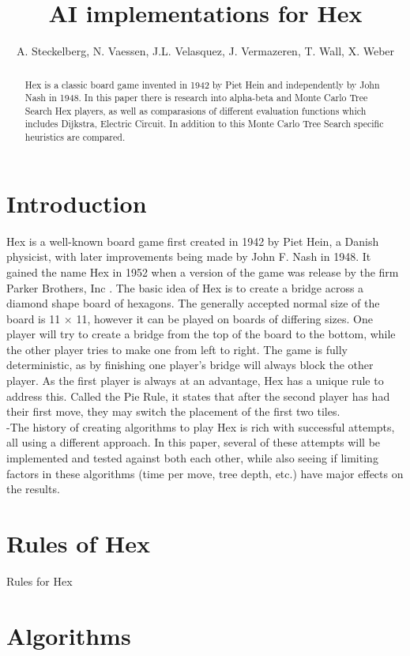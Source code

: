 \documentclass{ba-kecs}
\title{AI implementations for Hex}
\author{A. Steckelberg, N. Vaessen, J.L. Velasquez, J. Vermazeren, T. Wall, X. Weber}
\begin{document}
\maketitle

\begin{abstract}
 Hex is a classic board game invented in 1942 by Piet Hein and independently by John Nash in 1948. In this paper there is research into alpha-beta and Monte Carlo Tree Search Hex players, as well as comparasions of different evaluation functions which includes Dijkstra, Electric Circuit. In addition to this Monte Carlo Tree Search specific heuristics are compared.   
\end{abstract}

\section{Introduction}
Hex is a well-known board game first created in 1942 by Piet Hein, a Danish physicist, with later improvements being made by John F. Nash in 1948. It gained the name Hex in 1952 when a version of the game was release by the firm Parker Brothers, Inc \cite{gardener1959hex}. The basic idea of Hex is to create a bridge across a diamond shape board of hexagons. The generally accepted normal size of the board is 11 $\times$ 11, however it can be played on boards of differing sizes. One player will try to create a bridge from the top of the board to the bottom, while the other player tries to make one from left to right. The game is fully deterministic, as by finishing one player’s bridge will always block the other player. As the first player is always at an advantage, Hex has a unique rule to address this. Called the Pie Rule, it states that after the second player has had their first move, they may switch the placement of the first two tiles.\\
-The history of creating algorithms to play Hex is rich with successful attempts, all using a different approach. In this paper, several of these attempts will be implemented and tested against both each other, while also seeing if limiting factors in these algorithms (time per move, tree depth, etc.) have major effects on the results.



\section{Rules of Hex}
Rules for Hex

\section{Algorithms}
\end{document}
